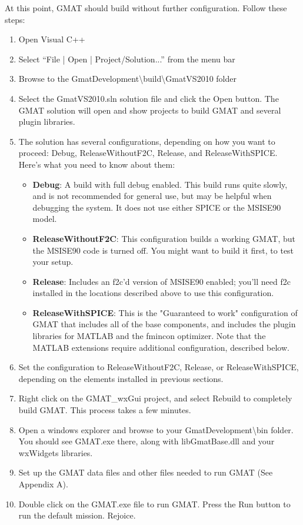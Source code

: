 \documentclass[letterpaper,10pt]{article}%
\begin{document}
At this point, GMAT should build without further configuration.  Follow these steps:
\begin{enumerate}
\item Open Visual C++
\item Select ``File | Open | Project/Solution...'' from the menu bar
\item Browse to the GmatDevelopment\textbackslash build\textbackslash GmatVS2010 folder
\item Select the GmatVS2010.sln solution file and click the Open button.  The GMAT solution will open and show projects to build GMAT and several plugin libraries.
\item The solution has several configurations, depending on how you want to proceed: Debug, ReleaseWithoutF2C, Release, and ReleaseWithSPICE.  Here's what you need to know about them:
\begin{itemize}
\item \textbf{Debug}:  A build with full debug enabled.  This build runs quite slowly, and is not recommended for general use, but may be helpful when debugging the system.  It does not use either SPICE or the MSISE90 model.
\item \textbf{ReleaseWithoutF2C}: This configuration builds a working GMAT, but the MSISE90 code is turned off.  You might want to build it first, to test your setup.
\item \textbf{Release}: Includes an f2c'd version of MSISE90 enabled; you'll need f2c installed in the locations described above to use this configuration.
\item \textbf{ReleaseWithSPICE}: This is the "Guaranteed to work" configuration of GMAT that includes all of the base components, and includes the plugin libraries for MATLAB and the fmincon optimizer.  Note that the MATLAB extensions require additional configuration, described below.
\end{itemize}
\item Set the configuration to ReleaseWithoutF2C, Release, or ReleaseWithSPICE, depending on the elements installed in previous sections.
\item Right click on the GMAT\_wxGui project, and select Rebuild to completely build GMAT.  This process takes a few minutes.  
\item Open a windows explorer and browse to your GmatDevelopment\textbackslash bin folder.  You should see GMAT.exe there, along with libGmatBase.dll and your wxWidgets libraries.
\item Set up the GMAT data files and other files needed to run GMAT (See Appendix A).
\item Double click on the GMAT.exe file to run GMAT.  Press the Run button to run the default mission.  Rejoice.
\end{enumerate}
\end{document}
